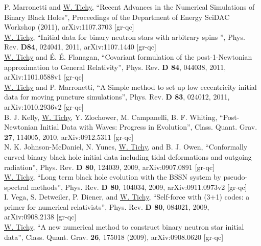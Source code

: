 \documentclass[11pt]{article}
\begin{document}
P. Marronetti and \underline{W. Tichy},
``Recent Advances in the Numerical Simulations of Binary Black Holes'',
Proceedings of the Department of Energy SciDAC Workshop (2011),
arXiv:1107.3703 [gr-qc]
\\

\underline{W. Tichy},
``Initial data for binary neutron stars with arbitrary spins '',
Phys. Rev. {\bf D84}, 024041, 2011,
arXiv:1107.1440 [gr-qc] 
\\

\underline{W. Tichy} and \'E. \'E. Flanagan,
``Covariant formulation of the post-1-Newtonian approximation to General
Relativity'', Phys. Rev. {\bf D 84}, 044038, 2011,
arXiv:1101.0588v1 [gr-qc]
\\

\underline{W. Tichy} and P. Marronetti,
``A Simple method to set up low eccentricity initial data for moving
puncture simulations'', Phys. Rev. {\bf D 83}, 024012, 2011,
arXiv:1010.2936v2 [gr-qc]
\\

B. J. Kelly, \underline{W. Tichy}, Y. Zlochower, M. Campanelli, B. F. Whiting, 
``Post-Newtonian Initial Data with Waves: Progress in Evolution'',
Class. Quant. Grav. {\bf 27}, 114005, 2010,  arXiv:0912.5311 [gr-qc]
\\

N. K. Johnson-McDaniel, N. Yunes, \underline{W. Tichy}, and B. J. Owen,
``Conformally curved binary black hole initial data including tidal
deformations and outgoing radiation'',
Phys. Rev. {\bf D 80}, 124039, 2009, arXiv:0907.0891 [gr-qc]
\\

\underline{W. Tichy},
``Long term black hole evolution with the BSSN system
by pseudo-spectral methods'',
Phys. Rev. {\bf D 80}, 104034, 2009, arXiv:0911.0973v2 [gr-qc] 
\\

I. Vega, S. Detweiler, P. Diener, and \underline{W. Tichy},
``Self-force with (3+1) codes: a primer for numerical relativists'',
Phys. Rev. {\bf D 80}, 084021, 2009, arXiv:0908.2138 [gr-qc]
\\

\underline{W. Tichy},
``A new numerical method to construct binary neutron star initial data'',
Class. Quant. Grav. {\bf 26}, 175018 (2009), arXiv:0908.0620 [gr-qc]
\\
\end{document}

